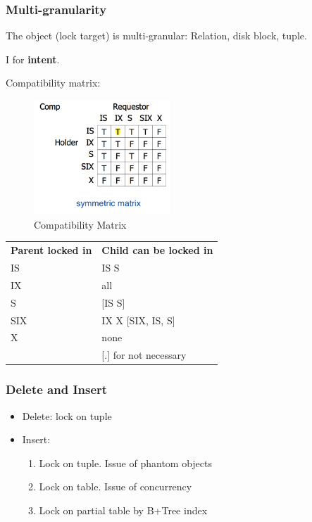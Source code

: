 \documentclass[a4paper]{report}
\begin{document}
\subsubsection{Multi-granularity}
The object (lock target) is multi-granular: Relation, disk block, tuple. 

I for \textbf{intent}.

Compatibility matrix:  
\begin{figure}[H]
    \centerline{\includegraphics[height = 1.7in]{img/lockModes}}
    \caption{Compatibility Matrix}
  \label{fig:compatibilityMatrix}
\end{figure}

\begin{tabular}{ll}
\hline\noalign{\smallskip}
\textbf{Parent locked in} & \textbf{Child can be locked in} \\
\noalign{\smallskip}\hline\noalign{\smallskip}
IS & IS S \\
IX & all \\
S & [IS S] \\
SIX & IX X [SIX, IS, S] \\
X & none\\
\noalign{\smallskip}\hline\noalign{\smallskip}
\caption{Hierarchy & [.] for not necessary}
\end{tabular}


\subsubsection{Delete and Insert}
\begin{itemize}
\item Delete: lock on tuple
\item Insert: 
\begin{enumerate}
\item Lock on tuple. Issue of phantom objects
\item Lock on table. Issue of concurrency 
\item Lock on partial table by B+Tree index
\end{enumerate}
\end{itemize}
\end{document}
